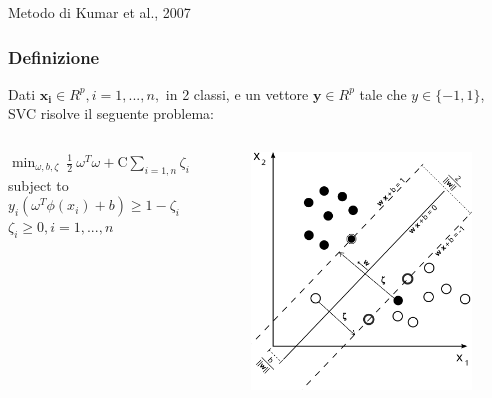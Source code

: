 \documentclass{beamer}
\begin{document}
\begin{section}{Metodo di Kumar et al., 2007}
\begin{frame}
\frametitle{Definizione}
Dati $ \boldsymbol{x_{i}} \in R^{p}, i=1,...,n,$ in 2 classi, e un vettore $ \boldsymbol{y} \in R^{p}$ tale che $y \in \{-1,1\}$, SVC risolve il seguente problema:\newline
\begin{columns}
\begin{column}{6cm}
\begin{center}
$\displaystyle\min_{\omega, b, \zeta} \ \frac{1}{2} \ \omega^{T}\omega + \mathrm{C} \sum_{i=1,n} \zeta_{i}$\newline
subject to $y_{i}(\omega^{T}\phi(x_{i}) + b) \ge 1 - \zeta_{i}$\newline
$\zeta_{i} \ge 0, i = 1,...,n$
\end{center}
\end{column}
\begin{column}{4cm}
\begin{figure}
\centering
\includegraphics[width=1\linewidth]{./img/svm}
\label{fig:svm}
\end{figure}
\end{column}
\end{columns}
\end{frame}


\end{section}
\end{document}
